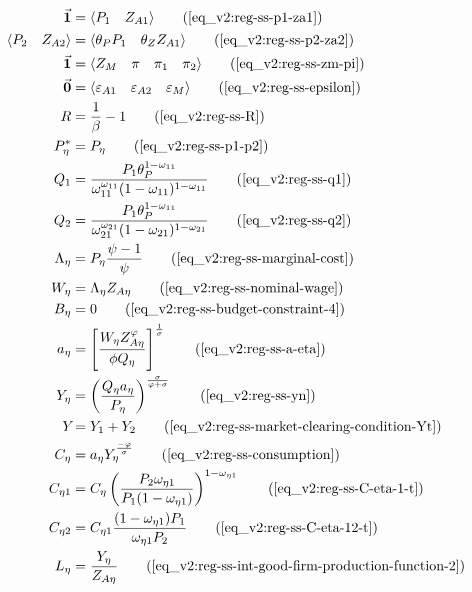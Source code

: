 \documentclass[../thesis.tex]{subfiles}
\begin{document}
	\begin{align}
		\vec{\bm{1}} &= \langle \begin{matrix} P_{1} & Z_{A1} \end{matrix} \rangle \tag{\ref{eq_v2:reg-ss-p1-za1}}
		\\ 
		\langle \begin{matrix} P_{2} & Z_{A2} \end{matrix} \rangle &= \langle \begin{matrix} \theta_{P} P_{1} & \theta_{Z} Z_{A1} \end{matrix} \rangle \tag{\ref{eq_v2:reg-ss-p2-za2}}
		\\
		\vec{\bm{1}} &= \langle \begin{matrix} Z_{M} & \pi & \pi_{1} & \pi_{2} \end{matrix} \rangle \tag{\ref{eq_v2:reg-ss-zm-pi}}
		\\
		\vec{\bm{0}} &= \langle \begin{matrix} \varepsilon_{A1} & \varepsilon_{A2} & \varepsilon_{M} \end{matrix} \rangle \tag{\ref{eq_v2:reg-ss-epsilon}}
		\\
		R &= \frac{1}{\beta} - 1 \tag{\ref{eq_v2:reg-ss-R}}
		\\
		P_{\eta}^{\ast} &= P_{\eta} \tag{\ref{eq_v2:reg-ss-p1-p2}} 
		\\
		Q_{1} &= \frac{P_{1} \theta_{P}^{1 - \omega_{11}}}{\omega_{11}^{\omega_{11}} (1 - \omega_{11})^{1 - \omega_{11}}} \tag{\ref{eq_v2:reg-ss-q1}} 
		\\
		Q_{2} &= \frac{P_{1} \theta_{P}^{1 - \omega_{11}}}{\omega_{21}^{\omega_{21}} (1 - \omega_{21})^{1 - \omega_{21}}} \tag{\ref{eq_v2:reg-ss-q2}} 
		\\
		\Lambda_{\eta} &= P_{\eta} \frac{\psi-1}{\psi} \tag{\ref{eq_v2:reg-ss-marginal-cost}} 
		\\
		W_{\eta} &= \Lambda_{\eta} Z_{A\eta} \tag{\ref{eq_v2:reg-ss-nominal-wage}} 
		\\
		B_{\eta} &= 0 \tag{\ref{eq_v2:reg-ss-budget-constraint-4}} 
		\\
		a_{\eta} &= \left[ \frac{W_{\eta} Z_{A\eta}^{\varphi}}{\phi  Q_{\eta}} \right]^{\frac{1}{\sigma}} \tag{\ref{eq_v2:reg-ss-a-eta}} 
		\\
		Y_{\eta} &= \left( \frac{Q_{\eta} a_{\eta}}{P_{\eta}} \right)^{\frac{\sigma}{\varphi + \sigma}} \tag{\ref{eq_v2:reg-ss-yn}} 
		\\
		Y_{} &= Y_{1} + Y_{2} \tag{\ref{eq_v2:reg-ss-market-clearing-condition-Yt}} 
		\\
		C_{\eta} &= a_{\eta} Y_{\eta}^{\frac{-\varphi}{\sigma}} \tag{\ref{eq_v2:reg-ss-consumption}} 
		\\
		C_{\eta 1} &= C_{\eta} \left( \frac{P_{2} \omega_{\eta 1}}{P_{1} (1 - \omega_{\eta 1})} \right)^{1-\omega_{\eta 1}} \tag{\ref{eq_v2:reg-ss-C-eta-1-t}} 
		\\
		C_{\eta 2} &= C_{\eta 1} \frac{(1 - \omega_{\eta 1}) P_{1}}{\omega_{\eta 1} P_{2}} \tag{\ref{eq_v2:reg-ss-C-eta-12-t}} 
		\\
		L_{\eta} &= \frac{Y_{\eta}}{Z_{A\eta}} \tag{\ref{eq_v2:reg-ss-int-good-firm-production-function-2}}
	\end{align}
\end{document}
